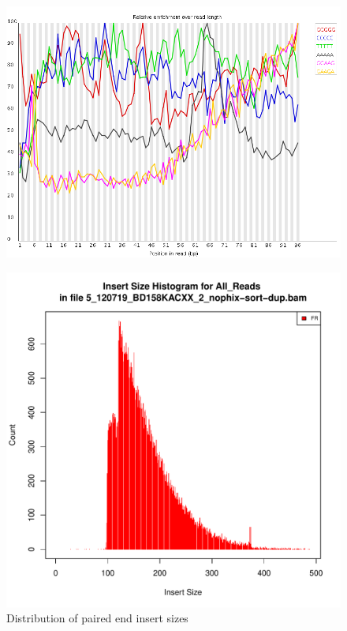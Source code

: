 \documentclass{article}
\begin{document}
    \begin{figure}[htbp]
      \centering
      \includegraphics[width=0.85\linewidth] {fastqc/5_120719_BD158KACXX_2_nophix-sort-dup_fastqc/Images/kmer_profiles.png}
      \caption{}
    \end{figure}
    \begin{figure}[htbp]
      \centering
      \includegraphics[width=0.75\linewidth] {5_120719_BD158KACXX_2_nophix-sort-dup-insert.pdf}
      \caption{Distribution of paired end insert sizes}
    \end{figure}


\FloatBarrier
\FloatBarrier
\end{document}
